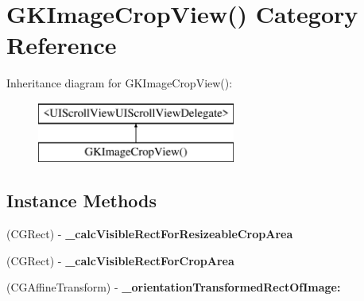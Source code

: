 \hypertarget{category_g_k_image_crop_view_07_08}{}\section{G\+K\+Image\+Crop\+View() Category Reference}
\label{category_g_k_image_crop_view_07_08}
Inheritance diagram for G\+K\+Image\+Crop\+View()\+:\begin{figure}[H]
\begin{center}
\leavevmode
\includegraphics[height=2.000000cm]{category_g_k_image_crop_view_07_08}
\end{center}
\end{figure}
\subsection*{Instance Methods}
\begin{DoxyCompactItemize}
\item 
\hypertarget{category_g_k_image_crop_view_07_08_a1f1adf5024f9db7aa5e14d618b8ec5fc}{}(C\+G\+Rect) -\/ {\bfseries \+\_\+calc\+Visible\+Rect\+For\+Resizeable\+Crop\+Area}\label{category_g_k_image_crop_view_07_08_a1f1adf5024f9db7aa5e14d618b8ec5fc}

\item 
\hypertarget{category_g_k_image_crop_view_07_08_a99bd04fe73a86490bf6fd597b0848149}{}(C\+G\+Rect) -\/ {\bfseries \+\_\+calc\+Visible\+Rect\+For\+Crop\+Area}\label{category_g_k_image_crop_view_07_08_a99bd04fe73a86490bf6fd597b0848149}

\item 
\hypertarget{category_g_k_image_crop_view_07_08_acb01d1f60bbb17243e5f184993e1b1e9}{}(C\+G\+Affine\+Transform) -\/ {\bfseries \+\_\+orientation\+Transformed\+Rect\+Of\+Image\+:}\label{category_g_k_image_crop_view_07_08_acb01d1f60bbb17243e5f184993e1b1e9}

\end{DoxyCompactItemize}
